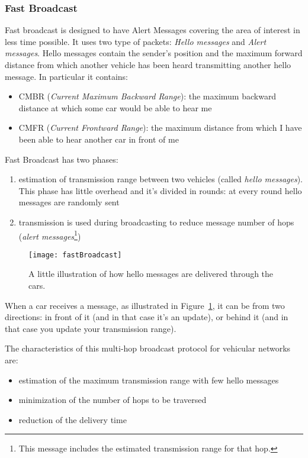 \subsubsection{Fast Broadcast}
Fast broadcast is designed to have Alert Messages covering the area of interest
in less time possible. It uses two type of packets: \textit{Hello messages} and
\textit{Alert messages}. Hello messages contain the sender's position and the
maximum forward distance from which another vehicle has been heard transmitting
another hello message. In particular it contains:
\begin{itemize}
\item CMBR (\textit{Current Maximum Backward Range}): the maximum backward
  distance at which some car would be able to hear me
\item CMFR (\textit{Current Frontward Range}): the maximum distance from which
  I have been able to hear another car in front of me
\end{itemize}

Fast Broadcast has two phases:
\begin{enumerate}
\item estimation of transmission range between two vehicles (called
  \textit{hello messages}). This phase has little overhead and it's divided in
  rounds: at every round
  hello messages are randomly sent
\item transmission is used during broadcasting to reduce message number of hops
  (\textit{alert messages}\footnote{This message includes the estimated
  transmission range for that hop.})
\end{enumerate}

\begin{figure}
  \centering
  \texttt{[image: fastBroadcast]}
  \caption[Hello Message propagation]{A little illustration of how hello
    messages are delivered through the cars.}
  \label{fig:802.11ws:helloMessageDelivery}
\end{figure}

When a car receives a message, as illustrated in
Figure~\ref{fig:802.11ws:helloMessageDelivery}, it can be from two directions:
in front of it (and in that case it's an update), or behind it (and in that case
you update your transmission range).

The characteristics of this multi-hop broadcast protocol for vehicular networks
are:
\begin{itemize}
\item estimation of the maximum transmission range with few hello messages
\item minimization of the number of hops to be traversed
\item reduction of the delivery time
\end{itemize}

